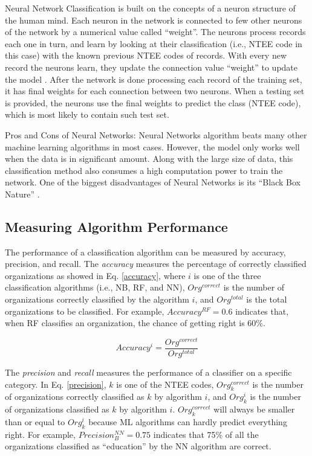 \documentclass[12pt]{article}
\begin{document}
Neural Network Classification is built on the concepts of a neuron structure of the human mind. Each neuron in the network is connected to few other neurons of the network by a numerical value called ``weight''. The neurons process records each one in turn, and learn by looking at their classification (i.e., NTEE code in this case) with the known previous NTEE codes of records. With every new record the neurons learn, they update the connection value ``weight'' to update the model \parencites[163]{collobert2008unified}. After the network is done processing each record of the training set, it has final weights for each connection between two neurons. When a testing set is provided, the neurons use the final weights to predict the class (NTEE code), which is most likely to contain such test set.

Pros and Cons of Neural Networks: Neural Networks algorithm beats many other machine learning algorithms in most cases. However, the model only works well when the data is in significant amount. Along with the large size of data, this classification method also consumes a high computation power to train the network. One of the biggest disadvantages of Neural Networks is its ``Black Box Nature'' \parencites{benitez1997artificial}.

\subsection{Measuring Algorithm Performance}

The performance of a classification algorithm can be measured by {accuracy}, {precision}, and {recall}. The \textit{accuracy} measures the percentage of correctly classified organizations as showed in Eq. \ref{accuracy}, where $i$ is one of the three classification algorithms (i.e., NB, RF, and NN), $Org^{correct}$ is the number of organizations correctly classified by the algorithm $i$, and $Org^{total}$ is the total organizations to be classified. For example, $Accuracy^{RF}=0.6$ indicates that, when RF classifies an organization, the chance of getting right is 60\%.

\begin{equation} \label{accuracy}
    Accuracy^i=\frac{Org^{correct}}{Org^{total}}
\end{equation}

The \textit{precision} and \textit{recall} measures the performance of a classifier on a specific category. In Eq. \ref{precision}, $k$ is one of the NTEE codes, $Org^{correct}_{k}$ is the number of organizations correctly classified as $k$ by algorithm $i$, and ${Org^{i}_{k}}$ is the number of organizations classified as $k$ by algorithm $i$. $Org^{correct}_{k}$ will always be smaller than or equal to ${Org^{i}_{k}}$ because ML algorithms can hardly predict everything right. For example, $Precision^{NN}_{B}=0.75$ indicates that 75\% of all the organizations classified as ``education'' by the NN algorithm are correct.
\end{document}
